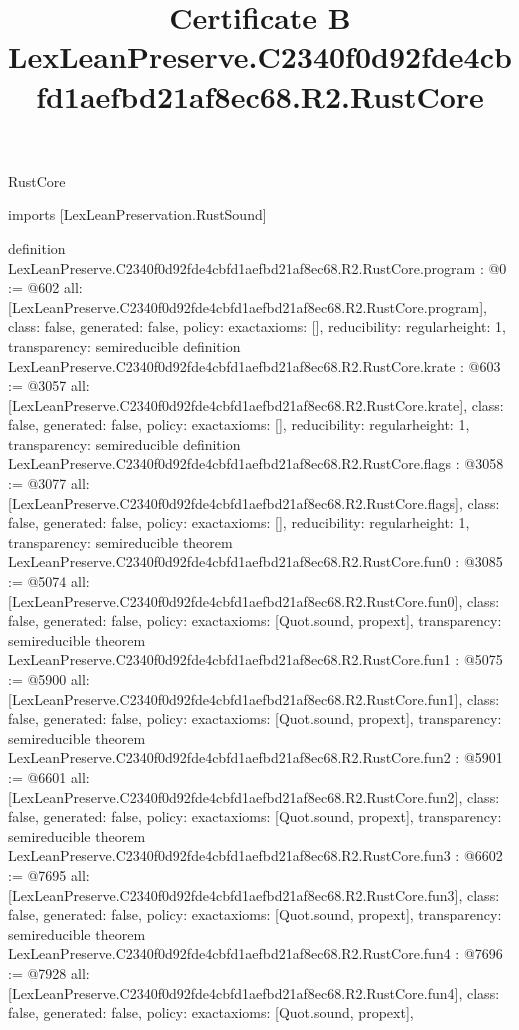 \begin{lexlean}{RustCore}
\title{Certificate B LexLeanPreserve.C2340f0d92fde4cbfd1aefbd21af8ec68.R2.RustCore}
\begin{coremodule}
imports [LexLeanPreservation.RustSound]

definition LexLeanPreserve.C2340f0d92fde4cbfd1aefbd21af8ec68.R2.RustCore.program : @0 := @602 {
  all: [LexLeanPreserve.C2340f0d92fde4cbfd1aefbd21af8ec68.R2.RustCore.program],
  class: false,
  generated: false,
  policy: exact{axioms: []},
  reducibility: regular{height: 1},
  transparency: semireducible
}
definition LexLeanPreserve.C2340f0d92fde4cbfd1aefbd21af8ec68.R2.RustCore.krate : @603 := @3057 {
  all: [LexLeanPreserve.C2340f0d92fde4cbfd1aefbd21af8ec68.R2.RustCore.krate],
  class: false,
  generated: false,
  policy: exact{axioms: []},
  reducibility: regular{height: 1},
  transparency: semireducible
}
definition LexLeanPreserve.C2340f0d92fde4cbfd1aefbd21af8ec68.R2.RustCore.flags : @3058 := @3077 {
  all: [LexLeanPreserve.C2340f0d92fde4cbfd1aefbd21af8ec68.R2.RustCore.flags],
  class: false,
  generated: false,
  policy: exact{axioms: []},
  reducibility: regular{height: 1},
  transparency: semireducible
}
theorem LexLeanPreserve.C2340f0d92fde4cbfd1aefbd21af8ec68.R2.RustCore.fun0 : @3085 := @5074 {
  all: [LexLeanPreserve.C2340f0d92fde4cbfd1aefbd21af8ec68.R2.RustCore.fun0],
  class: false,
  generated: false,
  policy: exact{axioms: [Quot.sound, propext]},
  transparency: semireducible
}
theorem LexLeanPreserve.C2340f0d92fde4cbfd1aefbd21af8ec68.R2.RustCore.fun1 : @5075 := @5900 {
  all: [LexLeanPreserve.C2340f0d92fde4cbfd1aefbd21af8ec68.R2.RustCore.fun1],
  class: false,
  generated: false,
  policy: exact{axioms: [Quot.sound, propext]},
  transparency: semireducible
}
theorem LexLeanPreserve.C2340f0d92fde4cbfd1aefbd21af8ec68.R2.RustCore.fun2 : @5901 := @6601 {
  all: [LexLeanPreserve.C2340f0d92fde4cbfd1aefbd21af8ec68.R2.RustCore.fun2],
  class: false,
  generated: false,
  policy: exact{axioms: [Quot.sound, propext]},
  transparency: semireducible
}
theorem LexLeanPreserve.C2340f0d92fde4cbfd1aefbd21af8ec68.R2.RustCore.fun3 : @6602 := @7695 {
  all: [LexLeanPreserve.C2340f0d92fde4cbfd1aefbd21af8ec68.R2.RustCore.fun3],
  class: false,
  generated: false,
  policy: exact{axioms: [Quot.sound, propext]},
  transparency: semireducible
}
theorem LexLeanPreserve.C2340f0d92fde4cbfd1aefbd21af8ec68.R2.RustCore.fun4 : @7696 := @7928 {
  all: [LexLeanPreserve.C2340f0d92fde4cbfd1aefbd21af8ec68.R2.RustCore.fun4],
  class: false,
  generated: false,
  policy: exact{axioms: [Quot.sound, propext]},
}
\end{coremodule}
\end{lexlean}
